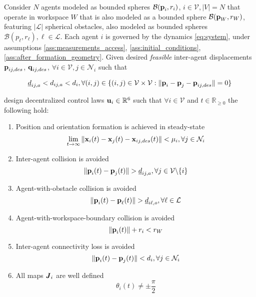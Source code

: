 \begin{bg_box}
\begin{problem}
  Consider $N$ agents modeled as bounded spheres $\mathcal{B}(\bm{\mathbf{p}}_i, r_i)$,
  $i \in \mathcal{V}, |V| = N$ that operate in workspace $W$ that is also modeled
  as a bounded sphere $\mathcal{B}(\bm{\mathbf{p}}_W,r_W)$, featuring $|\mathcal{L}|$ spherical obstacles,
  also modeled as bounded spheres $\mathcal{B}(p_{\ell}, r_{\ell}), \ell \in \mathcal{L}$.
  Each agent $i$ is governed by the dynamics \eqref{eq:system}, under assumptions
  \ref{ass:measurements_access}, \ref{ass:initial_conditions},
  \ref{ass:after_formation_geometry}. Given desired \textit{feasible}
  inter-agent displacements $\bm{\mathbf{p}}_{ij,des}$, $\bm{\mathbf{q}}_{ij,des}$,
  $\forall i \in \mathcal{V}, j \in \mathcal{N}_i$ such that

  $$\underline{d}_{ij,a} < d_{ij,a} < d_i, \forall (i,j) \in
  \{(i,j) \in \mathcal{V} \times \mathcal{V}:
  \|\bm{\mathbf{p}}_i - \bm{\mathbf{p}}_j - \bm{\mathbf{p}}_{ij,des}\| = 0\}$$

  design decentralized control laws $\bm{\mathbf{u}}_i \in \mathbb{R}^6$ such that
  $\forall i \in \mathcal{V}$ and $t \in \mathbb{R}_{\geq 0}$ the following
  hold:

  \begin{enumerate}

    \item Position and orientation formation is achieved in steady-state
      $$\lim_{t \to \infty} \|\bm{\mathbf{x}}_i(t) - \bm{\mathbf{x}}_j(t) - \bm{\mathbf{x}}_{ij,des}(t)\| < \mu_i,
        \forall j \in \mathcal{N}_i$$

    \item Inter-agent collision is avoided
      $$\|\bm{\mathbf{p}}_i(t) - \bm{\mathbf{p}}_j(t)\| > \underline{d}_{ij,a},
      \forall j \in \mathcal{V} \backslash \{i\}$$

    \item Agent-with-obstacle collision is avoided
      $$\|\bm{\mathbf{p}}_i(t) - \bm{\mathbf{p}}_{\ell}(t)\| > \underline{d}_{i\ell,o},
      \forall \ell \in \mathcal{L}$$

    \item Agent-with-workspace-boundary collision is avoided
      $$\|\bm{\mathbf{p}}_i(t)\| + r_i < r_W$$

    \item Inter-agent connectivity loss is avoided
      $$\|\bm{\mathbf{p}}_i(t) - \bm{\mathbf{p}}_j(t)\| < d_i,
      \forall j \in \mathcal{N}_i$$

    \item All maps $\bm{\mathit{J}}_i$ are well defined
      $$\theta_i(t) \ne \pm \frac{\pi}{2}$$

  \end{enumerate}
\label{problem}
\end{problem}
\end{bg_box}
